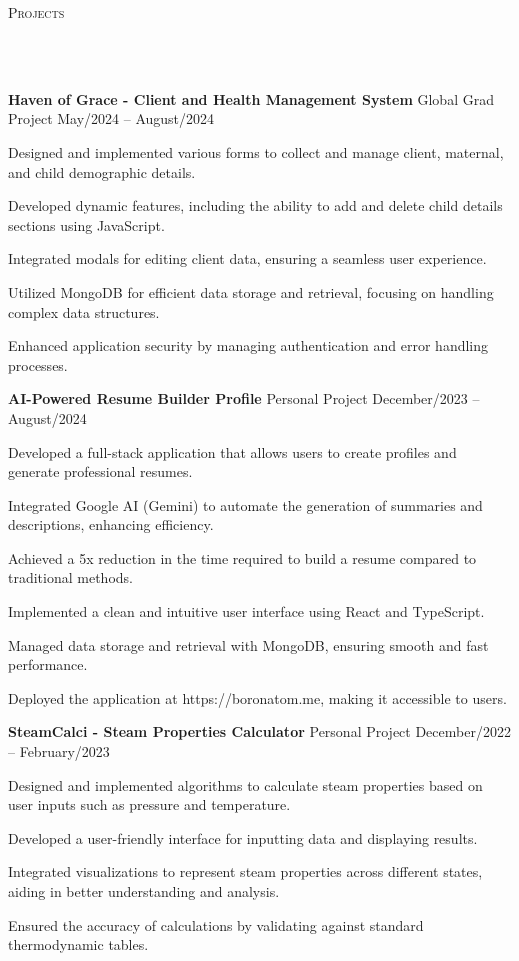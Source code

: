 \documentclass{article}
\newcommand{\project}[4]{{
          \vspace*{2pt}%
          \textbf{#1} #2 \hfill #3\\ #4 \vspace*{2pt}}
          }
\newcommand{\lineunder}{
        \vspace*{-8pt} \\ \hspace*{-18pt} 
        \hrulefill \\
        }
\newcommand{\header}[1]{{
        \hspace*{-15pt}\vspace*{6pt} \textsc{#1}} \vspace*{-6pt} 
        \lineunder
        }
\renewcommand{\labelitemii}{
        $\vcenter{\hbox{\tiny$\bullet$}}$\hspace*{-3pt}
        }
\newenvironment{bullet-list-minor}{
          \begin{list}{\labelitemii}{\setlength\leftmargin{15pt} 
            \topsep 0pt \itemsep -2pt}}{\vspace*{4pt}\end{list}
            }
\begin{document}
      \vspace*{4pt}%
      \header{Projects}
      {
      \project{Haven of Grace - Client and Health Management System}{Global Grad Project}{May/2024 -- August/2024}{
          \begin{bullet-list-minor}
              \item Designed and implemented various forms to collect and manage client, maternal, and child demographic details.
\item Developed dynamic features, including the ability to add and delete child details sections using JavaScript.
\item Integrated modals for editing client data, ensuring a seamless user experience.
\item Utilized MongoDB for efficient data storage and retrieval, focusing on handling complex data structures.
\item Enhanced application security by managing authentication and error handling processes.
          \end{bullet-list-minor}
      }
  

      \project{AI-Powered Resume Builder Profile}{ Personal Project}{December/2023 -- August/2024}{
          \begin{bullet-list-minor}
              \item Developed a full-stack application that allows users to create profiles and generate professional resumes.
\item Integrated Google AI (Gemini) to automate the generation of summaries and descriptions, enhancing efficiency.
\item Achieved a 5x reduction in the time required to build a resume compared to traditional methods.
\item Implemented a clean and intuitive user interface using React and TypeScript.
\item Managed data storage and retrieval with MongoDB, ensuring smooth and fast performance.
\item Deployed the application at https://boronatom.me, making it accessible to users.
          \end{bullet-list-minor}
      }
  

      \project{SteamCalci - Steam Properties Calculator}{Personal Project}{December/2022 -- February/2023}{
          \begin{bullet-list-minor}
              \item Designed and implemented algorithms to calculate steam properties based on user inputs such as pressure and temperature.
\item Developed a user-friendly interface for inputting data and displaying results.
\item Integrated visualizations to represent steam properties across different states, aiding in better understanding and analysis.
\item Ensured the accuracy of calculations by validating against standard thermodynamic tables.
          \end{bullet-list-minor}
      }
  }
  
\end{document}
